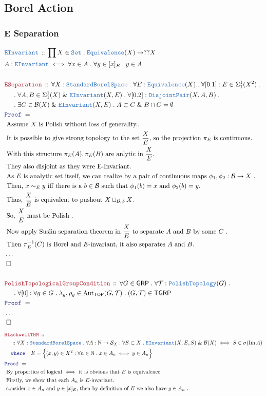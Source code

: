 \documentclass[12pt]{scrartcl}
\newcommand{\TYPE}[1]{\textcolor{NavyBlue}{\mathtt{#1}}}
\newcommand{\LOGIC}[1]{\textcolor{Blue}{\mathtt{#1}}}
\newcommand{\THM}[1]{\textcolor{Maroon}{\mathtt{#1}}}
\renewcommand{\.}{\; . \;}
\newcommand{\where}{\LOGIC{where}}
\newcommand{\Theorem}[2]{& \THM{#1} \, :: \, #2 \\ & \Proof = \\ }
\newcommand{\DeclareType}[2]{& \TYPE{#1} \, :: \, #2 \\}
\newcommand{\DefineType}[3]{& #1 : \TYPE{#2} \iff #3 \\}
\newcommand{\NewLine}{\\ & \kern 1pc}
\newcommand{\Page}[1]{ \begin{align*} #1 \end{align*}   }
\newcommand{\NoProof}{ & \ldots \\ \EndProof}
\newcommand{\Explain}[1]{& \text{#1.} \\}
\renewcommand{\And}{\; \& \;}
\newcommand{\Nat}{\mathbb{N} }
\DeclareMathOperator*{\im}{Im}
\newcommand{\Eq}{\TYPE{Equivalence}}
\newcommand{\Aut}{\mathrm{Aut}}
\newcommand{\Set}{\TYPE{Set}}
\newcommand{\QED}{\; \square}
\newcommand{\EndProof}{& \QED \\}
\newcommand{\Proof}{\LOGIC{Proof} \; }
\newcommand{\B}{\mathcal{B}}
\newcommand{\TOP}{\mathsf{TOP}}
\newcommand{\T}{\mathcal{T}}
\newcommand{\SBS}{\TYPE{StandardBorelSpace}}
\renewcommand{\S}{\mathcal{S}}
\newcommand{\GRP}{\mathsf{GRP}}
\newcommand{\TGRP}{\mathsf{TGRP}}
\renewcommand{\S}{\mathcal{S}}
\begin{document}
\subsection{Borel Action}
\subsubsection{E Separation}
\Page{
	\DeclareType{EInvariant}
	{
		\prod X \in \Set \.
		\Eq(X) \to ??X
	}
	\DefineType{A}{EInvariant}
	{
		\forall x \in A \. \forall y \in [x]_E \. y \in A
	}
	\\
	\Theorem{ESeparation}
	{
		\forall X : \SBS \.
		\forall E : \Eq(X) \.
		\forall [0.1] : E \in \Sigma^1_1(X^2) \. \NewLine \.
		\forall A,B \in \Sigma^1_1(X) \And \TYPE{EInvariant}(X,E) \.
		\forall [0.2] : \TYPE{DisjointPair}(X,A,B) \. \NewLine \.
		\exists C \in \B(X) \And \TYPE{EInvariant}(X,E) \.
		A \subset C \And B \cap C = \emptyset
	}
	\Explain{ Assume $X$ is Polish without loss of generality.}
	\Explain{ It is possible to give strong topology to the set $\frac{X}{E}$, 
		so the projection $\pi_E$ is continuous}
	\Explain{ With this structure $\pi_E(A),\pi_E(B)$ are anlytic in $\frac{X}{E}$}
	\Explain{ They also disjoint as they were E-Invariant}
	\Explain{ As $E$ is analytic set itself, we can realize by a pair of continuous maps 
		  $\phi_1,\phi_2 : \B \to X$ }
	\Explain{ Then, $x \sim_E y$ iff there is a $b \in \B$ such that $\phi_1(b) = x$ and $\phi_2(b)=y$}
	\Explain{ Thus, $\frac{X}{E}$ is equivalent to pushout $X \sqcup_{\B,\phi} X$}
	\Explain{ So, $\frac{X}{E}$ must be Polish }
	\Explain{ Now apply Suslin separation theorem in $\frac{X}{E}$ to separate
		$A$ and $B$ by some $C$ }
	\Explain{ Then $\pi_E^{-1}(C)$ is Borel and $E$-invariant, it also separates $A$ and $B$}
	\NoProof
	\\
	\Theorem{PolishTopologicalGroupCondition}
	{
		\forall G \in \GRP \.
		\forall \T : \TYPE{PolishTopology}(G) \. \NewLine \.
		\forall [0] : \forall g \in G \. \lambda_g, \rho_g \in \Aut_\TOP(G,\T) \.
		(G,\T) \in \TGRP
	}
	\NoProof
}\Page{
	\Theorem{BlackwellTHM}
	{
		\NewLine ::		
		\forall X : \SBS \.
		\forall A : \Nat \to \S_X \.
		\forall S \subset X \.
		\TYPE{EInvariant}(X,E,S) \And \B(X)
		\iff
		S \in \sigma(\im A)
		\NewLine
		\where \quad
		E =  \Big\{ (x,y) \in X^2 :  \forall n \in \Nat \. x \in A_n \iff y \in A_n  \Big\}			
	}
	\Explain{ By properties of logical $\iff$ it is obvious that $E$ is equivalence}
	\Explain{ Firstly, we show that each $A_n$ is $E$-invariant}
	\Explain{ consider $x \in A_n$ and $y \in [x]_E$, then by definition of $E$ we also have $y \in A_n$ }
}
\end{document}
